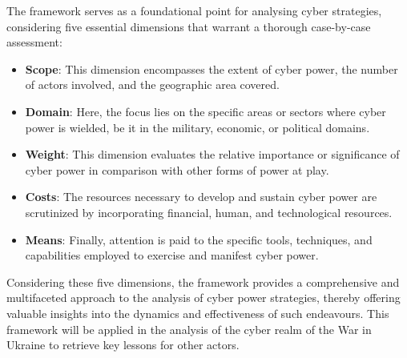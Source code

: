 The framework serves as a foundational point for analysing cyber strategies, considering five essential dimensions that warrant a thorough case-by-case assessment:
\begin{itemize}
 \item \textbf{Scope}: This dimension encompasses the extent of cyber power, the number of actors involved, and the geographic area covered.
 \item \textbf{Domain}: Here, the focus lies on the specific areas or sectors where cyber power is wielded, be it in the military, economic, or political domains.
 \item \textbf{Weight}: This dimension evaluates the relative importance or significance of cyber power in comparison with other forms of power at play.
 \item \textbf{Costs}: The resources necessary to develop and sustain cyber power are scrutinized by incorporating financial, human, and technological resources.
 \item \textbf{Means}: Finally, attention is paid to the specific tools, techniques, and capabilities employed to exercise and manifest cyber power.
\end{itemize}

Considering these five dimensions, the framework provides a comprehensive and multifaceted approach to the analysis of cyber power strategies, thereby offering valuable insights into the dynamics and effectiveness of such endeavours. This framework will be applied in the analysis of the cyber realm of the War in Ukraine to retrieve key lessons for other actors. 

\vspace{5cm}


